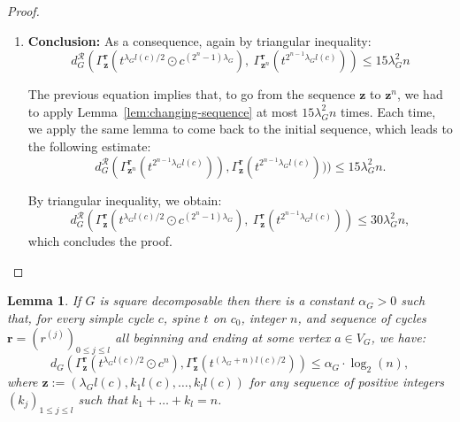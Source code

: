 \documentclass{article}
\newtheorem{lemma}[theorem]{Lemma}
\begin{document}
\begin{proof}
\begin{enumerate}
 Summing Equations~\ref{eq:1}, \ref{eq:2}, \ref{eq:3} and \ref{eq:4}, and by triangular inequality:
\[
d^{\mathcal{R}}_G(\Gamma^{\textbf{r}}_{\textbf{z}^{k-1}}(\gamma_{k-1}),\Gamma^{\textbf{r}}_{\textbf{z}^k}(\gamma_{k})) \le 4\lambda_G + { 3\lambda_G} + { 5\lambda_G ^2} + { 3\lambda_G} \le { 15\lambda_G^2}.
\]

\item \textbf{Conclusion:} As a consequence, again by triangular inequality:
\[
d_G^\mathcal{R}(\Gamma^{\textbf{r}}_{\textbf{z}}(t^{\lambda_G l(c)/2}\odot c^{(2^n-1)\lambda_G}),\ \Gamma^{\textbf{r}}_{\textbf{z}^{n}}(t^{2^{n-1} \lambda_G l(c)})) \le { 15 \lambda_G^2 n}
\]

The previous equation implies that, to go from the sequence $\textbf{z}$ to $\textbf{z}^n$, we had to apply Lemma~\ref{lem:changing-sequence} at most $15 \lambda_G^2 n$ times. Each time, we apply the same lemma to come back to the initial sequence, which leads to the following estimate:
\[
d_G^\mathcal{R}(\Gamma^{\textbf{r}}_{\textbf{z}^{n}}(t^{2^{n-1}\lambda_G l(c)})), \Gamma^{\textbf{r}}_{\textbf{z}}(t^{2^{n-1} \lambda_G l(c)}))) \le { 15 \lambda_G ^2 n}.
\]

By triangular inequality, we obtain: 
\[
d_G^\mathcal{R}(\Gamma^{\textbf{r}}_{\textbf{z}}(t^{\lambda_G l(c)/2}\odot c^{(2^n-1)\lambda_G}),\ \Gamma^{\textbf{r}}_{\textbf{z}}(t^{2^{n-1} \lambda_G l(c)})) \le { 30 \lambda_G ^2} n,
\]
which concludes the proof.\qedhere
	\end{enumerate}
\end{proof}

\begin{lemma}\label{proposition.log.upper.bound.general}
If $G$ is square decomposable then there is a constant $\alpha_G>0$ such that, for every simple cycle $c$, spine $t$ on $c_0$, integer $n$, and sequence of cycles $\textbf{r}=(r^{(j)})_{0 \le j \le l}$ all beginning and ending at some vertex $a\in V_G$, we have:
\[d_G (\Gamma^{\textbf{r}}_\textbf{z}(t^{\lambda_G l(c)/2} \odot c^{n}), \Gamma^{\textbf{r}}_\textbf{z}(t^{(\lambda_G +n)l(c)/2}))\le \alpha_G \cdot \log_2(n),\]
where $\textbf{z} := (\lambda_G l(c), k_1 l(c), \ldots , k_l l(c))$ for any sequence of positive integers $(k_j)_{1 \le j \le l}$ such that $k_1 + \hdots + k_l = n$.
\end{lemma}
\end{document}
